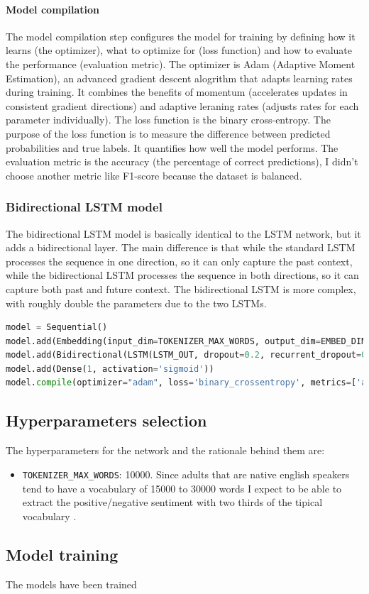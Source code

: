 \documentclass{article}
\begin{document}
\paragraph{Model compilation}
The model compilation step configures the model for training by defining how it learns (the optimizer), what to optimize for (loss function) and how to evaluate the performance (evaluation metric).
The optimizer is Adam (Adaptive Moment Estimation), an advanced gradient descent alogrithm that adapts learning rates during training.
It combines the benefits of momentum (accelerates updates in consistent gradient directions) and adaptive leraning rates (adjusts rates for each parameter individually).
The loss function is the binary cross-entropy.
The purpose of the loss function is to measure the difference between predicted probabilities and true labels.
It quantifies how well the model performs.
The evaluation metric is the accuracy (the percentage of correct predictions), I didn't choose another metric like F1-score because the dataset is balanced.

\subsubsection{Bidirectional LSTM model}

The bidirectional LSTM model is basically identical to the LSTM network, but it adds a bidirectional layer.
The main difference is that while the standard LSTM processes the sequence in one direction, so it can only capture the past context, while the bidirectional LSTM processes the sequence in both directions, so it can capture both past and future context.
The bidirectional LSTM is more complex, with roughly double the parameters due to the two LSTMs.

\begin{lstlisting}[language=python]
model = Sequential()
model.add(Embedding(input_dim=TOKENIZER_MAX_WORDS, output_dim=EMBED_DIM))
model.add(Bidirectional(LSTM(LSTM_OUT, dropout=0.2, recurrent_dropout=0.2)))
model.add(Dense(1, activation='sigmoid'))
model.compile(optimizer="adam", loss='binary_crossentropy', metrics=['accuracy'])
\end{lstlisting}

\subsection{Hyperparameters selection}

The hyperparameters for the network and the rationale behind them are:
\begin{itemize}
  \item \verb|TOKENIZER_MAX_WORDS|: 10000. Since adults that are native english speakers tend to have a vocabulary of 15000 to 30000 words I expect to be able to extract the positive/negative sentiment with two thirds of the tipical vocabulary \cite{babbelDoesYour}.
\end{itemize}


\subsection{Model training}
The models have been trained 



\end{document}
